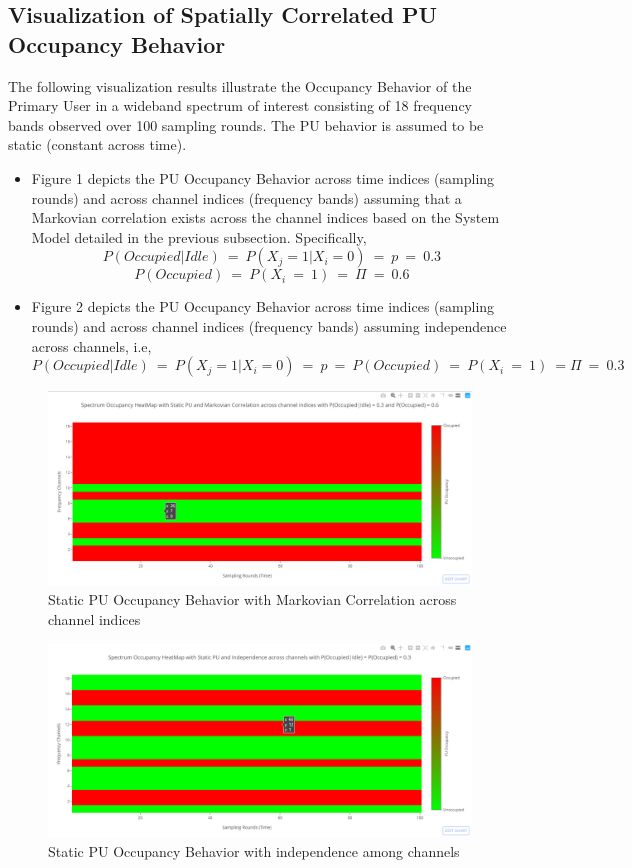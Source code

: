 \documentclass[12pt, draftcls, onecolumn]{IEEEtran}
\begin{document}
\subsection{Visualization of Spatially Correlated PU Occupancy Behavior}
The following visualization results illustrate the Occupancy Behavior of the Primary User in a wideband spectrum of interest consisting of 18 frequency bands observed over 100 sampling rounds. The PU behavior is assumed to be static (constant across time).
\begin{itemize}
    \item Figure 1 depicts the PU Occupancy Behavior across time indices (sampling rounds) and across channel indices (frequency bands) assuming that a Markovian correlation exists across the channel indices based on the System Model detailed in the previous subsection. Specifically,
    \[P(Occupied|Idle)\ =\ P(X_j = 1|X_i = 0)\ =\ p\ =\ 0.3\]
    \[P(Occupied)\ =\ P(X_i\ =\ 1)\ =\ \Pi\ =\ 0.6\]
    \item Figure 2 depicts the PU Occupancy Behavior across time indices (sampling rounds) and across channel indices (frequency bands) assuming independence across channels, i.e,
    \[P(Occupied|Idle)\ =\ P(X_j = 1|X_i = 0)\ =\ p\ =\ P(Occupied)\ =\ P(X_i\ =\ 1)\ = \Pi\ =\ 0.3\]
\end{itemize}
\begin{figure}[t]
\includegraphics[width=1.0\textwidth]{Spectrum_Occupancy_HeatMap_Static_Spatial_Corr.png}
\caption{Static PU Occupancy Behavior with Markovian Correlation across channel indices}
\label{fig:mesh1}
\centering
\end{figure}
\begin{figure}[t]
\includegraphics[width=1.0\textwidth]{Spectrum_Occupancy_HeatMap_Static_Independence.png}
\caption{Static PU Occupancy Behavior with independence among channels}
\label{fig:mesh2}
\centering
\end{figure}
\end{document}
